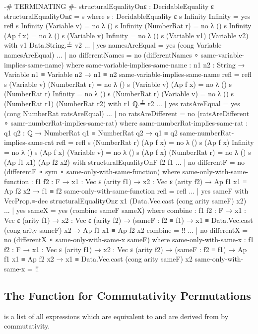 \documentclass{report}
\begin{document}
\begin{code}
{-# TERMINATING #-}
structuralEqualityOnε : DecidableEquality ε
structuralEqualityOnε = s
  where
  s : DecidableEquality ε
  s Infinity Infinity = yes refl
  s Infinity (Variable v) = no λ ()
  s Infinity (NumberRat r) = no λ ()
  s Infinity (Ap f x) = no λ ()
  s (Variable v) Infinity = no λ ()
  s (Variable v1) (Variable v2) with v1 Data.String.≟ v2
  ... | yes namesAreEqual = yes (cong Variable namesAreEqual)
  ... | no differentNames = no (differentNames ∘ same-variable-implies-same-name)
    where
    same-variable-implies-same-name :
      {n1 n2 : String} →
      Variable n1 ≡ Variable n2 →
      n1 ≡ n2
    same-variable-implies-same-name refl = refl
  s (Variable v) (NumberRat r) = no λ ()
  s (Variable v) (Ap f x) = no λ ()
  s (NumberRat r) Infinity = no λ ()
  s (NumberRat r) (Variable v) = no λ ()
  s (NumberRat r1) (NumberRat r2) with r1 ℚ.≟ r2
  ... | yes ratsAreEqual = yes (cong NumberRat ratsAreEqual)
  ... | no ratsAreDifferent = no (ratsAreDifferent ∘ same-numberRat-implies-same-rat)
    where
    same-numberRat-implies-same-rat :
      {q1 q2 : ℚ} →
      NumberRat q1 ≡ NumberRat q2 →
      q1 ≡ q2
    same-numberRat-implies-same-rat refl = refl
  s (NumberRat r) (Ap f x) = no λ ()
  s (Ap f x) Infinity = no λ ()
  s (Ap f x) (Variable v) = no λ ()
  s (Ap f x) (NumberRat r) = no λ ()
  s (Ap f1 x1) (Ap f2 x2) with structuralEqualityOnF f2 f1
  ... | no differentF = no (differentF ∘ sym ∘ same-only-with-same-function)
    where
    same-only-with-same-function :
      {f1 f2 : F} →
      {x1 : Vec ε (arity f1)} →
      {x2 : Vec ε (arity f2)} →
      Ap f1 x1 ≡ Ap f2 x2 →
      f1 ≡ f2
    same-only-with-same-function refl = refl
  ... | yes sameF with VecProp.≡-dec structuralEqualityOnε
                                     x1 (Data.Vec.cast (cong arity sameF) x2)
  ... | yes sameX = yes (combine sameF sameX)
    where
    combine :
      {f1 f2 : F} →
      {x1 : Vec ε (arity f1)} →
      {x2 : Vec ε (arity f2)} →
      (sameF : f2 ≡ f1) →
      x1 ≡ Data.Vec.cast (cong arity sameF) x2 →
      Ap f1 x1 ≡ Ap f2 x2
    combine = {!!}
  ... | no differentX = no (differentX ∘ same-only-with-same-x sameF)
    where
    same-only-with-same-x :
      {f1 f2 : F} →
      {x1 : Vec ε (arity f1)} →
      {x2 : Vec ε (arity f2)} →
      (sameF : f2 ≡ f1) →
      Ap f1 x1 ≡ Ap f2 x2 →
      x1 ≡ Data.Vec.cast (cong arity sameF) x2
    same-only-with-same-x = {!!}
\end{code}

\subsection{The Function for Commutativity Permutations}
  is a list of all expressions which are equivalent to  and are derived from  by commutativity.
\end{document}
